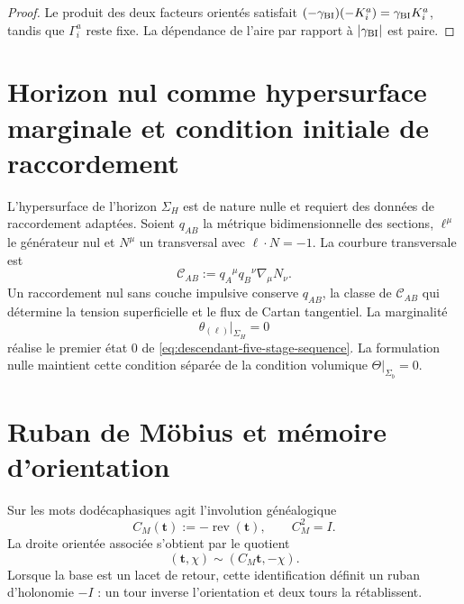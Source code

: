 \begin{proof}
Le produit des deux facteurs orientés satisfait
\((-\gamma_{\rm BI})(-K_i^a)=\gamma_{\rm BI}K_i^a\), tandis que \(\Gamma_i^a\)
reste fixe. La dépendance de l'aire par rapport à \(|\gamma_{\rm BI}|\) est paire.
\end{proof}

\section{Horizon nul comme hypersurface marginale et condition initiale de raccordement}

L'hypersurface de l'horizon \(\Sigma_H\) est de nature nulle et requiert des
données de raccordement adaptées. Soient \(q_{AB}\) la métrique bidimensionnelle des
sections, \(\ell^\mu\) le générateur nul et \(N^\mu\) un transversal avec
\(\ell\cdot N=-1\). La courbure transversale est
\begin{equation}
 \mathcal C_{AB}
 :=q_A{}^\mu q_B{}^\nu\nabla_\mu N_\nu.
 \label{eq:descendant-null-transverse-curvature}
\end{equation}
Un raccordement nul sans couche impulsive conserve \(q_{AB}\), la classe de
\(\mathcal C_{AB}\) qui détermine la tension superficielle et le flux de
Cartan tangentiel. La marginalité
\begin{equation}
 \theta_{(\ell)}\big|_{\Sigma_H}=0
 \label{eq:descendant-null-marginality}
\end{equation}
réalise le premier état \(0\) de
\cref{eq:descendant-five-stage-sequence}. La formulation nulle maintient
cette condition séparée de la condition volumique
\(\Theta|_{\Sigma_b}=0\).

\section{Ruban de Möbius et mémoire d'orientation}

Sur les mots dodécaphasiques agit l'involution généalogique
\begin{equation}
 C_M(\mathbf t):=-\operatorname{rev}(\mathbf t),
 \qquad
 C_M^2=I.
 \label{eq:descendant-CM}
\end{equation}
La droite orientée associée s'obtient par le quotient
\begin{equation}
 (\mathbf t,\chi)\sim(C_M\mathbf t,-\chi).
 \label{eq:descendant-Mobius-quotient}
\end{equation}
Lorsque la base est un lacet de retour, cette identification définit un ruban
d'holonomie \(-I\) : un tour inverse l'orientation et deux tours la
rétablissent.

